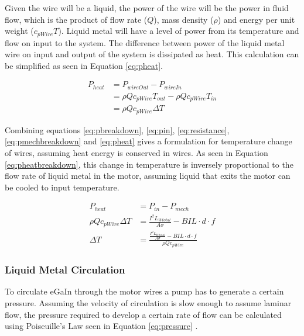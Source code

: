 \documentclass[a4paper,12pt]{article}
\begin{document}
 Given the wire will be a liquid, the power of the wire will be the power in fluid flow, which is the product of flow rate ($Q$), mass density ($\rho$) and energy per unit weight ($c_{pWire}T$). Liquid metal will have a level of power from its temperature and flow on input to the system. The difference between power of the liquid metal wire on input and output of the system is dissipated as heat. This calculation can be simplified as seen in Equation \ref{eq:pheat}.

\begin{equation}\label{eq:pheat}
    \begin{split}
    	P_{heat} & = P_{wireOut} - P_{wireIn} \\
		& = \rho Q c_{pWire} T_{out} - \rho Q c_{pWire} T_{in} \\
		& = \rho Q c_{pWire} \Delta T
    \end{split}
\end{equation}

Combining equations \ref{eq:pbreakdown}, \ref{eq:pin}, \ref{eq:resistance}, \ref{eq:pmechbreakdown} and \ref{eq:pheat} gives a formulation for temperature change of wires, assuming heat energy is conserved in wires. As seen in Equation \ref{eq:pheatbreakdown}, this change in temperature is inversely proportional to the flow rate of liquid metal in the motor, assuming liquid that exits the motor can be cooled to input temperature.

\begin{equation}\label{eq:pheatbreakdown}
    \begin{split}
        P_{heat} & = P_{in}-P_{mech}\\
        \rho Q c_{pWire} \Delta T & = \frac{I^2L_{Wtotal}}{A\sigma}-BIL\cdot d \cdot f \\
        \Delta T & = \frac{\frac{I^2L_{Wtotal}}{A\sigma}-BIL\cdot d \cdot f}{\rho Q c_{pWire}}
    \end{split}
\end{equation}

\subsubsection{Liquid Metal Circulation}
To circulate eGaIn through the motor wires a pump has to generate a certain pressure. Assuming the velocity of circulation is slow enough to assume laminar flow, the pressure required to develop a certain rate of flow can be calculated using Poiseuille's Law seen in Equation \ref{eq:pressure} \cite{pfitznerPoiseuilleHisLaw1976}.
\end{document}

